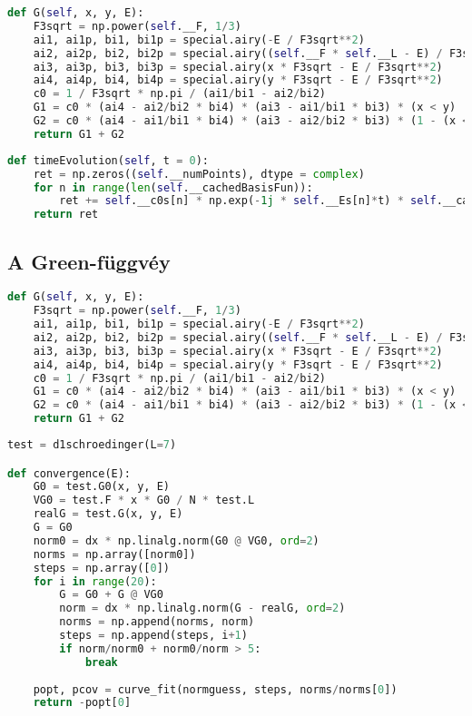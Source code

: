 \begin{lstlisting}[language=Python]
def G(self, x, y, E):
    F3sqrt = np.power(self.__F, 1/3)
    ai1, ai1p, bi1, bi1p = special.airy(-E / F3sqrt**2)
    ai2, ai2p, bi2, bi2p = special.airy((self.__F * self.__L - E) / F3sqrt**2)
    ai3, ai3p, bi3, bi3p = special.airy(x * F3sqrt - E / F3sqrt**2)
    ai4, ai4p, bi4, bi4p = special.airy(y * F3sqrt - E / F3sqrt**2)
    c0 = 1 / F3sqrt * np.pi / (ai1/bi1 - ai2/bi2)
    G1 = c0 * (ai4 - ai2/bi2 * bi4) * (ai3 - ai1/bi1 * bi3) * (x < y)
    G2 = c0 * (ai4 - ai1/bi1 * bi4) * (ai3 - ai2/bi2 * bi3) * (1 - (x < y))
    return G1 + G2
\end{lstlisting}

\begin{lstlisting}[language=Python]
def timeEvolution(self, t = 0):
    ret = np.zeros((self.__numPoints), dtype = complex)
    for n in range(len(self.__cachedBasisFun)):
        ret += self.__c0s[n] * np.exp(-1j * self.__Es[n]*t) * self.__cachedBasisFun[n, :]
    return ret
\end{lstlisting}
\subsection{A Green-függvéy}
\begin{lstlisting}[language=Python]
def G(self, x, y, E):
    F3sqrt = np.power(self.__F, 1/3)
    ai1, ai1p, bi1, bi1p = special.airy(-E / F3sqrt**2)
    ai2, ai2p, bi2, bi2p = special.airy((self.__F * self.__L - E) / F3sqrt**2)
    ai3, ai3p, bi3, bi3p = special.airy(x * F3sqrt - E / F3sqrt**2)
    ai4, ai4p, bi4, bi4p = special.airy(y * F3sqrt - E / F3sqrt**2)
    c0 = 1 / F3sqrt * np.pi / (ai1/bi1 - ai2/bi2)
    G1 = c0 * (ai4 - ai2/bi2 * bi4) * (ai3 - ai1/bi1 * bi3) * (x < y)
    G2 = c0 * (ai4 - ai1/bi1 * bi4) * (ai3 - ai2/bi2 * bi3) * (1 - (x < y))
    return G1 + G2
\end{lstlisting}

\begin{lstlisting}[language=Python]
test = d1schroedinger(L=7)

def convergence(E):
    G0 = test.G0(x, y, E)
    VG0 = test.F * x * G0 / N * test.L
    realG = test.G(x, y, E)
    G = G0
    norm0 = dx * np.linalg.norm(G0 @ VG0, ord=2)
    norms = np.array([norm0])
    steps = np.array([0])
    for i in range(20):
        G = G0 + G @ VG0
        norm = dx * np.linalg.norm(G - realG, ord=2)
        norms = np.append(norms, norm)
        steps = np.append(steps, i+1)
        if norm/norm0 + norm0/norm > 5:
            break
    
    popt, pcov = curve_fit(normguess, steps, norms/norms[0])
    return -popt[0]
\end{lstlisting}